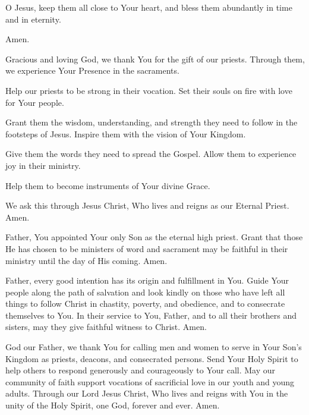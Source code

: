 O Jesus, keep them all close to Your heart,
and bless them abundantly in time and in eternity.

Amen.

Gracious and loving God, we thank You for the gift of our priests.
Through them, we experience Your Presence in the sacraments.

Help our priests to be strong in their vocation.
Set their souls on fire with love for Your people.

Grant them the wisdom, understanding, and strength they need to follow in the footsteps of Jesus.
Inspire them with the vision of Your Kingdom.

Give them the words they need to spread the Gospel.
Allow them to experience joy in their ministry.

Help them to become instruments of Your divine Grace.

We ask this through Jesus Christ, Who lives and reigns as our Eternal Priest.
Amen.

Father, You appointed Your only Son as the eternal high priest.
Grant that those He has chosen to be ministers of word and sacrament may be faithful in their ministry until the day of His coming.
Amen.

Father, every good intention has its origin and fulfillment in You.
Guide Your people along the path of salvation and look kindly on those who have left all things to follow Christ in chastity, poverty, and obedience, and to consecrate themselves to You.
In their service to You, Father, and to all their brothers and sisters, may they give faithful witness to Christ.
Amen.

God our Father, we thank You for calling men and women to serve in Your Son's Kingdom as priests, deacons, and consecrated persons.
Send Your Holy Spirit to help others to respond generously and courageously to Your call.
May our community of faith support vocations of sacrificial love in our youth and young adults.
Through our Lord Jesus Christ, Who lives and reigns with You in the unity of the Holy
Spirit, one God, forever and ever.
Amen.

\newpage